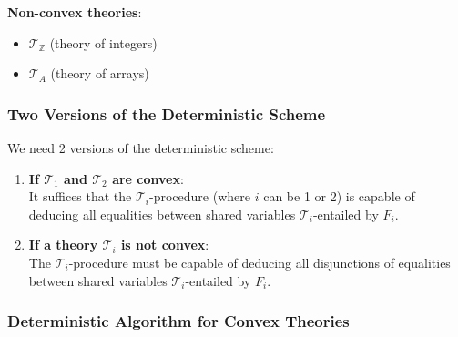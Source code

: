 \documentclass[11pt,a4paper]{article}
\theoremstyle{definition}
\theoremstyle{plain}
\theoremstyle{remark}
\begin{document}
\textbf{Non-convex theories}:
\begin{itemize}
    \item $\mathcal{T}_{\mathbb{Z}}$ (theory of integers)
    \item $\mathcal{T}_A$ (theory of arrays)
\end{itemize} 

\subsubsection{Two Versions of the Deterministic Scheme}

We need 2 versions of the deterministic scheme:

\begin{enumerate}
    \item \textbf{If $\mathcal{T}_1$ and $\mathcal{T}_2$ are convex}: \\
    It suffices that the $\mathcal{T}_i$-procedure (where $i$ can be 1 or 2) is capable of deducing all equalities between shared variables $\mathcal{T}_i$-entailed by $F_i$.

    \item \textbf{If a theory $\mathcal{T}_i$ is not convex}: \\
    The $\mathcal{T}_i$-procedure must be capable of deducing all disjunctions of equalities between shared variables $\mathcal{T}_i$-entailed by $F_i$.
\end{enumerate}

\subsubsection{Deterministic Algorithm for Convex Theories}
\end{document}
